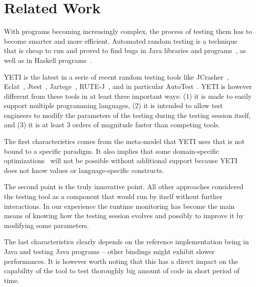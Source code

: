 \section{Related Work}\label{sec:rw}

With programs becoming increasingly complex, the process of testing 
them has to become smarter and more efficient. Automated random testing
is a technique that is cheap to run and proved to find bugs in Java libraries and 
programs~\cite{Pacheco2005,Csallner2004}, as well as in Haskell 
programs~\cite{Claessen00quickcheck:a}.

YETI is the latest in a serie of recent random testing tools like
JCrasher~\cite{Csallner2004}, Eclat~\cite{Pacheco2005}, Jtest~\cite{Jtest},
Jartege~\cite{Oriat2004}, RUTE-J~\cite{Andrews2006a}, and in particular 
AutoTest~\cite{Ciupa2007,CLOM:08:AARTOO,CPLOM:08:PRTOOS}. YETI is however 
different from these tools in at least three important ways: (1) it is made to 
easily support multiple programming languages, (2) 
it is intended to allow test engineers to modify the parameters of the 
testing during the testing session itself, and (3) it is at least 3 orders 
of magnitude faster than competing tools. 

The first characteristics comes from
the meta-model that YETI uses that is not bound to a specific paradigm.
It also implies that some domain-specific optimizations~\cite{Pacheco2007,Godefroid2005,Chen2004a,Chen2005} will not be possible 
without additional support because YETI does not know values or language-specific
constructs. 

The second point is the truly innovative point. All other approaches
considered the testing tool as a component that would run by itself without 
further interactions. In our experience the runtime monitoring has become 
the main means of knowing how the testing session evolves and possibly to 
improve it by modifying some parameters. 

The last characteristics 
clearly depends on the reference implementation being in Java and testing Java
programs -- other bindings might exhibit slower performances. It is however 
worth noting that this has a direct impact on the capability of the tool to 
test thoroughly big amount of code in short period of time.
